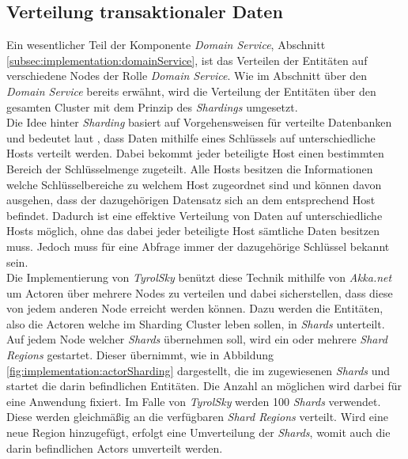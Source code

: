 \subsection{Verteilung transaktionaler Daten}
\label{subsec:implementation:akkaSharding}
Ein wesentlicher Teil der Komponente \textit{Domain Service}, Abschnitt \ref{subsec:implementation:domainService}, ist das Verteilen der Entitäten auf verschiedene Nodes der Rolle \textit{Domain Service}. Wie im Abschnitt über den \textit{Domain Service} bereits erwähnt, wird die Verteilung der Entitäten über den gesamten Cluster mit dem Prinzip des \textit{Shardings} umgesetzt. \\
Die Idee hinter \textit{Sharding} basiert auf Vorgehensweisen für verteilte Datenbanken und bedeutet laut \cite{shardingCattell}, dass Daten mithilfe eines Schlüssels auf unterschiedliche Hosts verteilt werden. Dabei bekommt jeder beteiligte Host einen bestimmten Bereich der Schlüsselmenge zugeteilt. Alle Hosts besitzen die Informationen welche Schlüsselbereiche zu welchem Host zugeordnet sind und können davon ausgehen, dass der dazugehörigen Datensatz sich an dem entsprechend Host befindet. Dadurch ist eine effektive Verteilung von Daten auf unterschiedliche Hosts möglich, ohne das dabei jeder beteiligte Host sämtliche Daten besitzen muss. Jedoch muss für eine Abfrage immer der dazugehörige Schlüssel bekannt sein. \\
Die Implementierung von \textit{TyrolSky} benützt diese Technik mithilfe von \textit{Akka.net} um Actoren über mehrere Nodes zu verteilen und dabei sicherstellen, dass diese von jedem anderen Node erreicht werden können. Dazu werden die Entitäten, also die Actoren welche im Sharding Cluster leben sollen, in \textit{Shards} unterteilt. Auf jedem Node welcher \textit{Shards} übernehmen soll, wird ein oder mehrere  \textit{Shard Regions} gestartet. Dieser übernimmt, wie in Abbildung \ref{fig:implementation:actorSharding} dargestellt, die im zugewiesenen \textit{Shards} und startet die darin befindlichen Entitäten. Die Anzahl an möglichen  wird darbei für eine Anwendung fixiert. Im Falle von \textit{TyrolSky} werden {100} \textit{Shards} verwendet. Diese werden gleichmäßig an die verfügbaren \textit{Shard Regions} verteilt. Wird eine neue Region hinzugefügt, erfolgt eine Umverteilung der \textit{Shards}, womit auch die darin befindlichen Actors umverteilt werden. 

